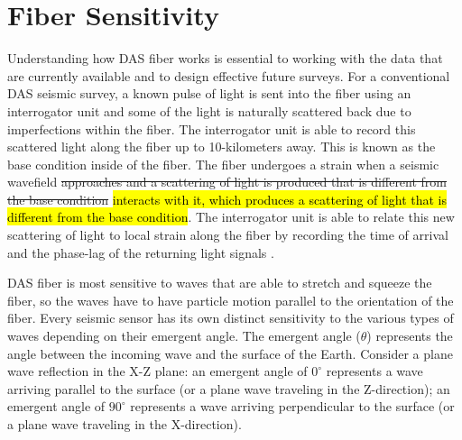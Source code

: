 \section{Fiber Sensitivity}
Understanding how DAS fiber works is essential to working with the data that are currently available and to design effective future surveys. For a conventional DAS seismic survey, a known pulse of light is sent into the fiber using an interrogator unit and some of the light is naturally scattered back due to imperfections within the fiber. The interrogator unit is able to record this scattered light along the fiber up to 10-kilometers away. This is known as the base condition inside of the fiber. The fiber undergoes a strain when a seismic wavefield \sout{approaches and a scattering of light is produced that is different from the base condition} \hl{interacts with it, which produces a scattering of light that is different from the base condition}. The interrogator unit is able to relate this new scattering of light to local strain along the fiber by recording the time of arrival and the phase-lag of the returning light signals \citep{Parker2014}.

DAS fiber is most sensitive to waves that are able to stretch and squeeze the fiber, so the waves have to have particle motion parallel to the orientation of the fiber. Every seismic sensor has its own distinct sensitivity to the various types of waves depending on their emergent angle. The emergent angle ($\theta$) represents the angle between the incoming wave and the surface of the Earth. Consider a plane wave reflection in the X-Z plane: an emergent angle of $0^{\circ}$ represents a wave arriving parallel to the surface (or a plane wave traveling in the Z-direction); an emergent angle of $90^{\circ}$ represents a wave arriving perpendicular to the surface (or a plane wave traveling in the X-direction).

